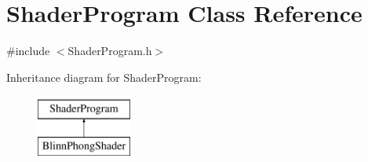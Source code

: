 \hypertarget{class_shader_program}{}\section{Shader\+Program Class Reference}
\label{class_shader_program}


{\ttfamily \#include $<$Shader\+Program.\+h$>$}

Inheritance diagram for Shader\+Program\+:\begin{figure}[H]
\begin{center}
\leavevmode
\includegraphics[height=2.000000cm]{class_shader_program}
\end{center}
\end{figure}
